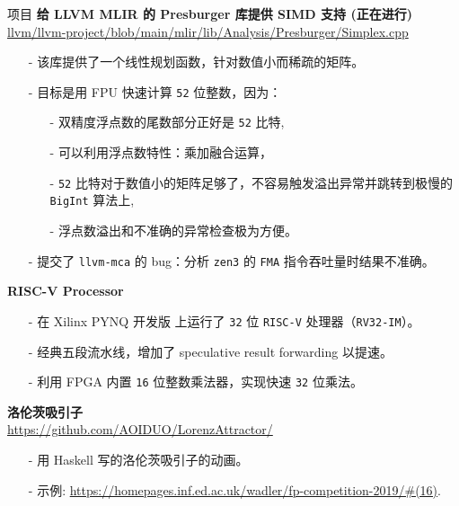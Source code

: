 \documentclass{resume} %
\newcommand{\itemsepval}{-6pt}
\newcommand{\code}{\texttt}
\begin{document}
\begin{rSection}{项目}
    \textbf{给 LLVM MLIR 的 Presburger 库提供 SIMD 支持 (正在进行)} \hfill \\
    \url{llvm/llvm-project/blob/main/mlir/lib/Analysis/Presburger/Simplex.cpp} \hfill \par
    \begin{itemize}
        \itemsep \itemsepval {} 
        \item[-] 该库提供了一个线性规划函数，针对数值小而稀疏的矩阵。
        \item[-] 目标是用 FPU 快速计算 \code{52} 位整数，因为： 
        \begin{itemize}
            \itemsep \itemsepval {} 
            \item[-] 双精度浮点数的尾数部分正好是 \code{52} 比特,
            \item[-] 可以利用浮点数特性：乘加融合运算，
            \item[-] \code{52} 比特对于数值小的矩阵足够了，不容易触发溢出异常并跳转到极慢的 \code{BigInt} 算法上, 
            \item[-] 浮点数溢出和不准确的异常检查极为方便。 
        \end{itemize}
    \item[-] 提交了 \code{llvm-mca} 的 bug：分析 \code{zen3} 的 \code{FMA} 指令吞吐量时结果不准确。 
    \end{itemize}

    \textbf{RISC-V Processor} \par
    \begin{itemize}
        \itemsep \itemsepval {} 
        \item[-] 在 Xilinx PYNQ 开发版 上运行了 \code{32} 位 \code{RISC-V} 处理器（\code{RV32-IM}）。
        \item[-] 经典五段流水线，增加了 speculative result forwarding 以提速。
        \item[-] 利用 FPGA 内置 \code{16} 位整数乘法器，实现快速 \code{32} 位乘法。
    \end{itemize}
    
    \textbf{洛伦茨吸引子} \hfill \\
    \url{https://github.com/AOIDUO/LorenzAttractor/} \hfill \par
    \begin{itemize}
        \itemsep \itemsepval {} 
        \item[-] 用 Haskell 写的洛伦茨吸引子的动画。
        \item[-] 示例: \url{https://homepages.inf.ed.ac.uk/wadler/fp-competition-2019/#(16)}.
    \end{itemize}


\end{rSection}
\end{document}
